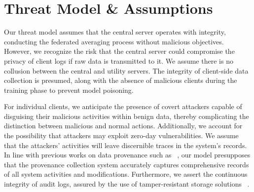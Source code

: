 
\section{Threat Model \& Assumptions}

Our threat model assumes that the central server operates with integrity, conducting the federated averaging process without malicious objectives. However, we recognize the risk that the central server could compromise the privacy of client logs if raw data is transmitted to it. We assume there is no collusion between the central and utility servers. The integrity of client-side data collection is presumed, along with the absence of malicious clients during the training phase to prevent model poisoning.

For individual clients, we anticipate the presence of covert attackers capable of disguising their malicious activities within benign data, thereby complicating the distinction between malicious and normal actions. Additionally, we account for the possibility that attackers may exploit zero-day vulnerabilities. We assume that the attackers' activities will leave discernible traces in the system's records. In line with previous works on data provenance such as ~\cite{nodoze2019, priotracker2018, mzx2016, bates2017transparent}, our model presupposes that the provenance collection system accurately captures comprehensive records of all system activities and modifications. Furthermore, we assert the continuous integrity of audit logs, assured by the use of tamper-resistant storage solutions ~\cite{paccagnella2020custos, hardlog}.